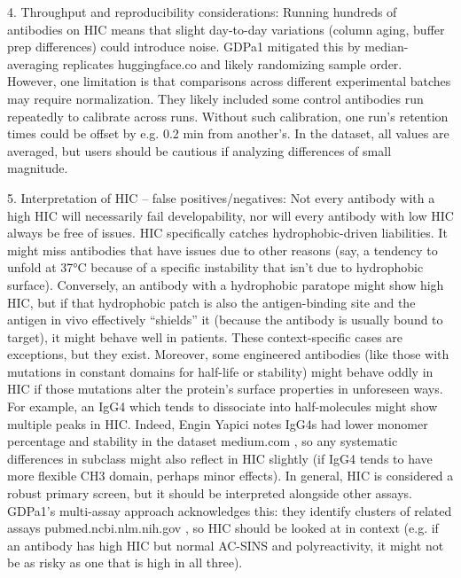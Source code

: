 \documentclass[12pt]{article}
\begin{document}
4. Throughput and reproducibility considerations: Running hundreds of antibodies on HIC means that slight day-to-day variations (column aging, buffer prep differences) could introduce noise. GDPa1 mitigated this by median-averaging replicates
huggingface.co
 and likely randomizing sample order. However, one limitation is that comparisons across different experimental batches may require normalization. They likely included some control antibodies run repeatedly to calibrate across runs. Without such calibration, one run’s retention times could be offset by e.g. 0.2 min from another’s. In the dataset, all values are averaged, but users should be cautious if analyzing differences of small magnitude.

5. Interpretation of HIC – false positives/negatives: Not every antibody with a high HIC will necessarily fail developability, nor will every antibody with low HIC always be free of issues. HIC specifically catches hydrophobic-driven liabilities. It might miss antibodies that have issues due to other reasons (say, a tendency to unfold at 37°C because of a specific instability that isn’t due to hydrophobic surface). Conversely, an antibody with a hydrophobic paratope might show high HIC, but if that hydrophobic patch is also the antigen-binding site and the antigen in vivo effectively “shields” it (because the antibody is usually bound to target), it might behave well in patients. These context-specific cases are exceptions, but they exist. Moreover, some engineered antibodies (like those with mutations in constant domains for half-life or stability) might behave oddly in HIC if those mutations alter the protein’s surface properties in unforeseen ways. For example, an IgG4 which tends to dissociate into half-molecules might show multiple peaks in HIC. Indeed, Engin Yapici notes IgG4s had lower monomer percentage and stability in the dataset
medium.com
, so any systematic differences in subclass might also reflect in HIC slightly (if IgG4 tends to have more flexible CH3 domain, perhaps minor effects). In general, HIC is considered a robust primary screen, but it should be interpreted alongside other assays. GDPa1’s multi-assay approach acknowledges this: they identify clusters of related assays
pubmed.ncbi.nlm.nih.gov
, so HIC should be looked at in context (e.g. if an antibody has high HIC but normal AC-SINS and polyreactivity, it might not be as risky as one that is high in all three).
\end{document}
